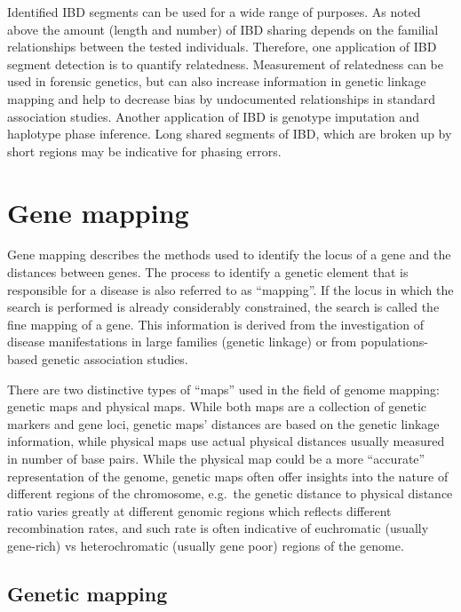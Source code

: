 Identified IBD segments can be used for a wide range of purposes. As noted above the amount (length and number) of IBD sharing depends on the familial relationships between the tested individuals. Therefore, one application of IBD segment detection is to quantify relatedness. Measurement of relatedness can be used in forensic genetics, but can also increase information in genetic linkage mapping and help to decrease bias by undocumented relationships in standard association studies. Another application of IBD is genotype imputation and haplotype phase inference. Long shared segments of IBD, which are broken up by short regions may be indicative for phasing errors.

\hypertarget{gene-mapping}{%
\section{Gene mapping}\label{gene-mapping}}

Gene mapping describes the methods used to identify the locus of a gene and the distances between genes. The process to identify a genetic element that is responsible for a disease is also referred to as ``mapping''. If the locus in which the search is performed is already considerably constrained, the search is called the fine mapping of a gene. This information is derived from the investigation of disease manifestations in large families (genetic linkage) or from populations-based genetic association studies.

There are two distinctive types of ``maps'' used in the field of genome mapping: genetic maps and physical maps. While both maps are a collection of genetic markers and gene loci, genetic maps' distances are based on the genetic linkage information, while physical maps use actual physical distances usually measured in number of base pairs. While the physical map could be a more ``accurate'' representation of the genome, genetic maps often offer insights into the nature of different regions of the chromosome, e.g.~the genetic distance to physical distance ratio varies greatly at different genomic regions which reflects different recombination rates, and such rate is often indicative of euchromatic (usually gene-rich) vs heterochromatic (usually gene poor) regions of the genome.

\hypertarget{genetic-mapping}{%
\subsection{Genetic mapping}\label{genetic-mapping}}

